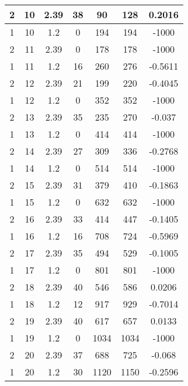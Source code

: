 \documentclass[letterpaper, 12pt]{article}
\begin{document}
\begin{longtable}{|c|c|c|c|c|c|c|}
\hline
2 & 10 & 2.39 & 38 & 90 & 128 & 0.2016 \\
\hline
1 & 10 & 1.2 & 0 & 194 & 194 & -1000 \\
\hline
2 & 11 & 2.39 & 0 & 178 & 178 & -1000 \\
\hline
1 & 11 & 1.2 & 16 & 260 & 276 & -0.5611 \\
\hline
2 & 12 & 2.39 & 21 & 199 & 220 & -0.4045 \\
\hline
1 & 12 & 1.2 & 0 & 352 & 352 & -1000 \\
\hline
2 & 13 & 2.39 & 35 & 235 & 270 & -0.037 \\
\hline
1 & 13 & 1.2 & 0 & 414 & 414 & -1000 \\
\hline
2 & 14 & 2.39 & 27 & 309 & 336 & -0.2768 \\
\hline
1 & 14 & 1.2 & 0 & 514 & 514 & -1000 \\
\hline
2 & 15 & 2.39 & 31 & 379 & 410 & -0.1863 \\
\hline
1 & 15 & 1.2 & 0 & 632 & 632 & -1000 \\
\hline
2 & 16 & 2.39 & 33 & 414 & 447 & -0.1405 \\
\hline
1 & 16 & 1.2 & 16 & 708 & 724 & -0.5969 \\
\hline
2 & 17 & 2.39 & 35 & 494 & 529 & -0.1005 \\
\hline
1 & 17 & 1.2 & 0 & 801 & 801 & -1000 \\
\hline
2 & 18 & 2.39 & 40 & 546 & 586 & 0.0206 \\
\hline
1 & 18 & 1.2 & 12 & 917 & 929 & -0.7014 \\
\hline
2 & 19 & 2.39 & 40 & 617 & 657 & 0.0133 \\
\hline
1 & 19 & 1.2 & 0 & 1034 & 1034 & -1000 \\
\hline
2 & 20 & 2.39 & 37 & 688 & 725 & -0.068 \\
\hline
1 & 20 & 1.2 & 30 & 1120 & 1150 & -0.2596 \\
\hline
\end{longtable}
\end{document}
